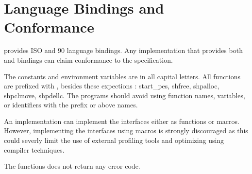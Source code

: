 \section{Language Bindings and Conformance}



\openshmem provides ISO \Clang{} and \Fortran{} 90 language
bindings. Any implementation that provides both \Clang{} and \Fortran{} bindings 
can claim conformance to the specification.


The \openshmem{} constants and environment variables are in all capital letters. 
All \openshmem{} functions are prefixed with \shmemprefix{}, besides these 
expections : start\_pes{}, shfree{}, shpalloc{}, shpclmove{}, shpdellc{}. 
The \openshmem{} programs should avoid using function names, variables, or
identifiers with the prefix \shmemprefix{} or above names.
 
An \openshmem{} implementation can implement the interfaces either 
as functions or macros. However, implementing the interfaces using macros is
strongly discouraged as this could severly limit the use of external profiling tools 
and optimizing using compiler techniques.

The \openshmem{}
functions does not return any error code. 

